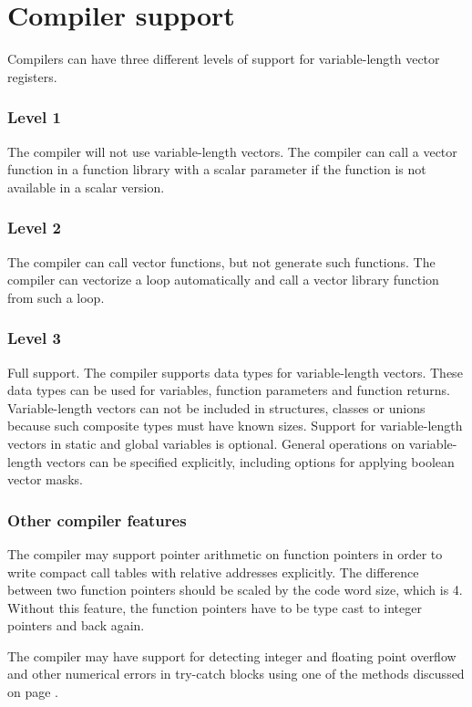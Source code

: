 \documentclass[forwardcom.tex]{subfiles}
\begin{document}
\section{Compiler support} \label{compilerSupport}
Compilers can have three different levels of support for variable-length vector registers. 

\subsubsection{Level 1}
The compiler will not use variable-length vectors. The compiler can call a vector function in a function library with a scalar parameter if the function is not available in a scalar version. 

\subsubsection{Level 2}
The compiler can call vector functions, but not generate such functions. The compiler can vectorize a loop automatically and call a vector library function from such a loop. 

\subsubsection{Level 3}
Full support. The compiler supports data types for variable-length vectors. These data types can be used for variables, function parameters and function returns. Variable-length vectors can not be included in structures, classes or unions because such composite types must have known sizes. Support for variable-length vectors in static and global variables is optional.
\vspace{2mm}
General operations on variable-length vectors can be specified explicitly, including options for applying boolean vector masks.

\subsubsection{Other compiler features}
The compiler may support pointer arithmetic on function pointers in order to write compact call tables with relative addresses explicitly. The difference between two function pointers should be scaled by the code word size, which is 4. Without this feature, the function pointers have to be type cast to integer pointers and back again. 

\vspace{2mm}
The compiler may have support for detecting integer and floating point overflow and other numerical errors in try-catch blocks using one of the methods discussed on page \pageref{integerOverflowDetection}.
\end{document}
